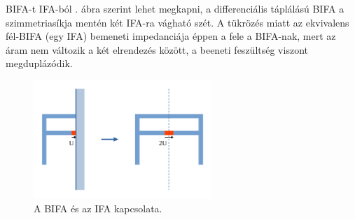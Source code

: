 \par BIFA-t IFA-ból . ábra szerint lehet megkapni, a differenciális táplálású BIFA a szimmetriasíkja mentén két IFA-ra vágható szét. A tükrözés miatt az ekvivalens fél-BIFA (egy IFA) bemeneti impedanciája éppen a fele a BIFA-nak, mert az áram nem változik a két elrendezés között, a beeneti feszültség viszont megduplázódik.
\begin{figure}[h]
	\centering
	\includegraphics[width=0.6\textwidth]{kep/ifa-bifa.pdf}
	\caption{A BIFA és az IFA kapcsolata.}
	\label{fig:ifa-bifa}
\end{figure}
